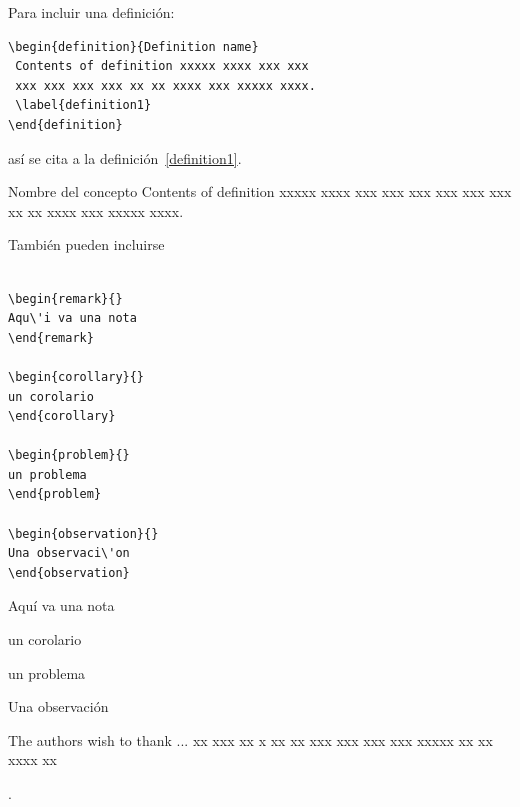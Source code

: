 \documentclass{siep}
\begin{document}
Para incluir una definici\'on:

{\small \begin{verbatim}
\begin{definition}{Definition name}
 Contents of definition xxxxx xxxx xxx xxx
 xxx xxx xxx xxx xx xx xxxx xxx xxxxx xxxx.
 \label{definition1}
\end{definition}
\end{verbatim}}
\noindent as\'i se cita a la definici\'on~\ref{definition1}.
\medskip
\begin{definition}{ Nombre del concepto}
 Contents of definition xxxxx xxxx xxx xxx
 xxx xxx xxx xxx xx xx xxxx xxx xxxxx xxxx.
 \label{definition1}
\end{definition}

\medskip\noindent
Tambi\'en pueden incluirse

\begin{verbatim}

\begin{remark}{}
Aqu\'i va una nota
\end{remark}

\begin{corollary}{}
un corolario
\end{corollary}

\begin{problem}{}
un problema
\end{problem}

\begin{observation}{}
Una observaci\'on
\end{observation}

\end{verbatim}

\begin{remark}{}
Aqu\'i va una nota
\end{remark}

\begin{corollary}{}
un corolario
\end{corollary}

\begin{problem}{}
un problema
\end{problem}

\begin{observation}{}
Una observaci\'on
\end{observation}



\begin{acknowledgment}
 The authors wish to thank ... xx xxx xx x
 xx xx xxx xxx xxx xxx xxxxx xx xx xxxx xx
\end{acknowledgment}.
\end{document}
